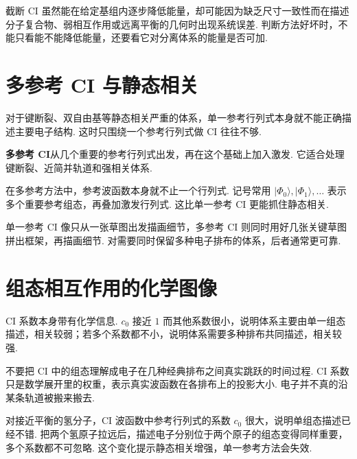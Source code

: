 \documentclass[UTF8,11pt,a4paper,openany]{ctexbook}
\newcommand{\ket}[1]{\lvert #1\rangle}\newcommand{\bra}[1]{\langle #1\rvert}
\newcommand{\term}[1]{\textbf{#1}}
\begin{document}
\begin{limitbox}
截断 CI 虽然能在给定基组内逐步降低能量，却可能因为缺乏尺寸一致性而在描述分子复合物、弱相互作用或远离平衡的几何时出现系统误差. 判断方法好坏时，不能只看能不能降低能量，还要看它对分离体系的能量是否可加. 
\end{limitbox}

\section{多参考 CI 与静态相关}

对于键断裂、双自由基等静态相关严重的体系，单一参考行列式本身就不能正确描述主要电子结构. 这时只围绕一个参考行列式做 CI 往往不够. 

\term{多参考 CI}从几个重要的参考行列式出发，再在这个基础上加入激发. 它适合处理键断裂、近简并轨道和强相关体系. 

\begin{notationbox}
在多参考方法中，参考波函数本身就不止一个行列式. 记号常用 $\ket{\Phi_0},\ket{\Phi_1},\ldots$ 表示多个重要参考组态，再叠加激发行列式. 这比单一参考 CI 更能抓住静态相关. 
\end{notationbox}

\begin{analogybox}
单一参考 CI 像只从一张草图出发描画细节，多参考 CI 则同时用好几张关键草图拼出框架，再描画细节. 对需要同时保留多种电子排布的体系，后者通常更可靠. 
\end{analogybox}

\section{组态相互作用的化学图像}

CI 系数本身带有化学信息. $c_0$ 接近 $1$ 而其他系数很小，说明体系主要由单一组态描述，相关较弱；若多个系数都不小，说明体系需要多种排布共同描述，相关较强. 

\begin{limitbox}
不要把 CI 中的组态理解成电子在几种经典排布之间真实跳跃的时间过程. CI 系数只是数学展开里的权重，表示真实波函数在各排布上的投影大小. 电子并不真的沿某条轨道被搬来搬去. 
\end{limitbox}

\begin{examplebox}
对接近平衡的氢分子，CI 波函数中参考行列式的系数 $c_0$ 很大，说明单组态描述已经不错. 把两个氢原子拉远后，描述电子分别位于两个原子的组态变得同样重要，多个系数都不可忽略. 这个变化提示静态相关增强，单一参考方法会失效. 
\end{examplebox}
\end{document}
